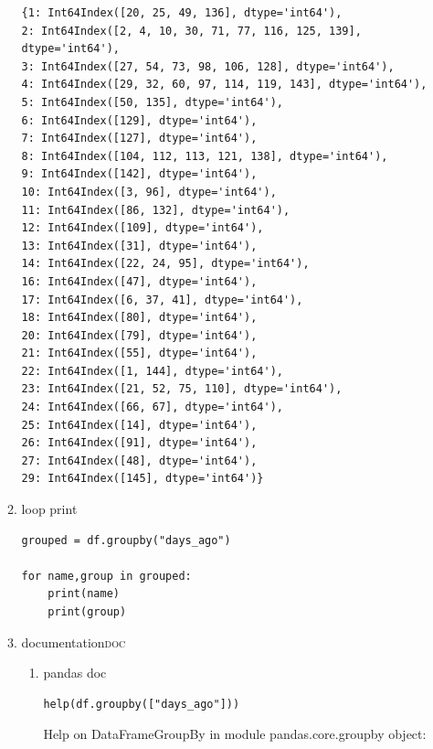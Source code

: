 \documentclass[11pt]{article}
\begin{document}
\begin{enumerate}
\begin{enumerate}
\begin{verbatim}
{1: Int64Index([20, 25, 49, 136], dtype='int64'),
2: Int64Index([2, 4, 10, 30, 71, 77, 116, 125, 139], dtype='int64'),
3: Int64Index([27, 54, 73, 98, 106, 128], dtype='int64'),
4: Int64Index([29, 32, 60, 97, 114, 119, 143], dtype='int64'),
5: Int64Index([50, 135], dtype='int64'),
6: Int64Index([129], dtype='int64'),
7: Int64Index([127], dtype='int64'),
8: Int64Index([104, 112, 113, 121, 138], dtype='int64'),
9: Int64Index([142], dtype='int64'),
10: Int64Index([3, 96], dtype='int64'),
11: Int64Index([86, 132], dtype='int64'),
12: Int64Index([109], dtype='int64'),
13: Int64Index([31], dtype='int64'),
14: Int64Index([22, 24, 95], dtype='int64'),
16: Int64Index([47], dtype='int64'),
17: Int64Index([6, 37, 41], dtype='int64'),
18: Int64Index([80], dtype='int64'),
20: Int64Index([79], dtype='int64'),
21: Int64Index([55], dtype='int64'),
22: Int64Index([1, 144], dtype='int64'),
23: Int64Index([21, 52, 75, 110], dtype='int64'),
24: Int64Index([66, 67], dtype='int64'),
25: Int64Index([14], dtype='int64'),
26: Int64Index([91], dtype='int64'),
27: Int64Index([48], dtype='int64'),
29: Int64Index([145], dtype='int64')}
\end{verbatim}
\item loop print
\label{sec:org969d240}
\begin{verbatim}
grouped = df.groupby("days_ago")

for name,group in grouped:
    print(name)
    print(group)
\end{verbatim}
\item documentation\hfill{}\textsc{doc}
\label{sec:org4676734}
\begin{enumerate}
\item pandas doc
\label{sec:org146c94c}
\begin{verbatim}
help(df.groupby(["days_ago"]))
\end{verbatim}

Help on DataFrameGroupBy in module pandas.core.groupby object:


\end{enumerate}
\end{enumerate}
\end{enumerate}
\end{document}
